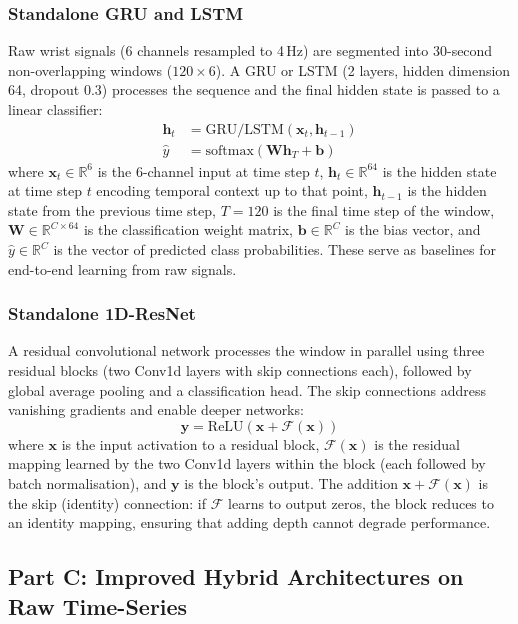 \documentclass[11pt]{article}
\begin{document}
\subsubsection{Standalone GRU and LSTM}
Raw wrist signals (6 channels resampled to 4\,Hz) are segmented into 30-second non-overlapping windows ($120 \times 6$).
A GRU or LSTM (2 layers, hidden dimension 64, dropout 0.3) processes the sequence and the final hidden state is passed to a linear classifier:
\begin{align}
\mathbf{h}_t &= \text{GRU/LSTM}(\mathbf{x}_t, \mathbf{h}_{t-1}) \\
\hat{y} &= \text{softmax}(\mathbf{W} \mathbf{h}_T + \mathbf{b})
\end{align}
where $\mathbf{x}_t \in \mathbb{R}^6$ is the 6-channel input at time step $t$, $\mathbf{h}_t \in \mathbb{R}^{64}$ is the hidden state at time step $t$ encoding temporal context up to that point, $\mathbf{h}_{t-1}$ is the hidden state from the previous time step, $T = 120$ is the final time step of the window, $\mathbf{W} \in \mathbb{R}^{C \times 64}$ is the classification weight matrix, $\mathbf{b} \in \mathbb{R}^C$ is the bias vector, and $\hat{y} \in \mathbb{R}^C$ is the vector of predicted class probabilities.
These serve as baselines for end-to-end learning from raw signals.

\subsubsection{Standalone 1D-ResNet}
A residual convolutional network processes the window in parallel using three residual blocks (two Conv1d layers with skip connections each), followed by global average pooling and a classification head.
The skip connections address vanishing gradients and enable deeper networks:
\begin{equation}
\mathbf{y} = \text{ReLU}(\mathbf{x} + \mathcal{F}(\mathbf{x}))
\end{equation}
where $\mathbf{x}$ is the input activation to a residual block, $\mathcal{F}(\mathbf{x})$ is the residual mapping learned by the two Conv1d layers within the block (each followed by batch normalisation), and $\mathbf{y}$ is the block's output.
The addition $\mathbf{x} + \mathcal{F}(\mathbf{x})$ is the skip (identity) connection: if $\mathcal{F}$ learns to output zeros, the block reduces to an identity mapping, ensuring that adding depth cannot degrade performance.

\subsection{Part C: Improved Hybrid Architectures on Raw Time-Series}
\end{document}
